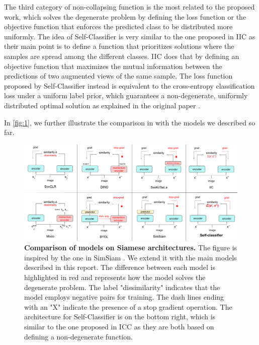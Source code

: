 \documentclass{article}
\begin{document}
The third category of non-collapsing function is the most related to the proposed work, which solves the degenerate problem by defining the loss function or the objective function that enforces the predicted class to be distributed more uniformly. The idea of Self-Classifier \cite{self_classifier} is very similar to the one proposed in IIC \cite{iic} as their main point is to define a function that prioritizes solutions where the samples are spread among the different classes. 
IIC does that by defining an objective function that maximizes the mutual information between the predictions of two augmented views of the same sample. 
The loss function proposed by Self-Classifier instead is equivalent to the cross-entropy classification loss under a uniform label prior, which guarantees a non-degenerate, uniformly distributed optimal solution as explained in the original paper \cite{self_classifier}.


In \autoref{fig:1}, we further illustrate the comparison in \cite{simsiam} with the models we described so far.

\begin{figure}
    \centering
     \includegraphics[width=\textwidth]{images/siamese_network_comparison.png}
     \caption{\textbf{Comparison of models on Siamese architectures.} The figure is inspired by the one in SimSiam \cite{simsiam}. We extend it with the main models described in this report. The difference between each model is highlighted in red and represents how the model solves the degenerate problem. The label "dissimilarity" indicates that the model employs negative pairs for training. The dash lines ending with an "X" indicate the presence of a stop gradient operation. The architecture for Self-Classifier is on the bottom right, which is similar to the one proposed in ICC \cite{iic} as they are both based on defining a non-degenerate function.}
    \label{fig:1}
\end{figure}
\end{document}
